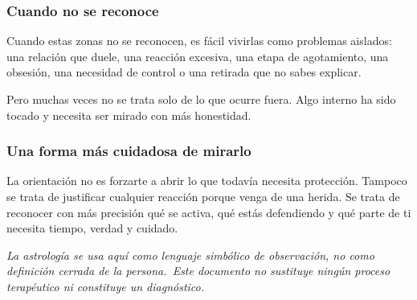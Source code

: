 \documentclass[11pt,a4paper]{article}
\begin{document}
\subsubsection*{Cuando no se reconoce}
Cuando estas zonas no se reconocen, es fácil vivirlas como problemas aislados: una relación que duele, una reacción excesiva, una etapa de agotamiento, una obsesión, una necesidad de control o una retirada que no sabes explicar.

Pero muchas veces no se trata solo de lo que ocurre fuera. Algo interno ha sido tocado y necesita ser mirado con más honestidad.

\subsubsection*{Una forma más cuidadosa de mirarlo}
La orientación no es forzarte a abrir lo que todavía necesita protección. Tampoco se trata de justificar cualquier reacción porque venga de una herida. Se trata de reconocer con más precisión qué se activa, qué estás defendiendo y qué parte de ti necesita tiempo, verdad y cuidado.

\vspace{1cm}
\begin{center}
{\small\itshape\color{grisai}
La astrología se usa aquí como lenguaje simbólico de observación, no como definición cerrada de la persona.\
Este documento no sustituye ningún proceso terapéutico ni constituye un diagnóstico.
}
\end{center}
\end{document}
